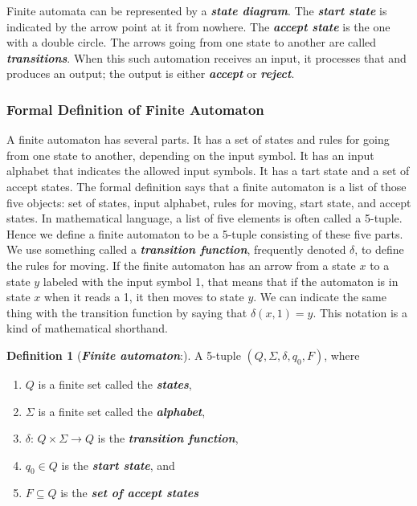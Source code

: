 \documentclass{article}
\theoremstyle{definition}
\newtheorem{definition}{Definition}[section]
\newcommand{\define}[1]{\textbf{\textit{#1}}}
\begin{document}
Finite automata can be represented by a \define{state diagram}. The \define{start state} is indicated by the arrow point at it from nowhere. The \define{accept state} is the one with a double circle. The arrows going from one state to another are called \define{transitions}. When this such automation receives an input, it processes that and produces an output; the output is either \define{accept} or \define{reject}. 

\subsubsection{Formal Definition of Finite Automaton}

A finite automaton has several parts. It has a set of states and rules for going from one state to another, depending on the input symbol. It has an input alphabet that indicates the allowed input symbols. It has a tart state and a set of accept states. The formal definition says that a finite automaton is a list of those five objects: set of states, input alphabet, rules for moving, start state, and accept states. In mathematical language, a list of five elements is often called a 5-tuple. Hence we define a finite automaton to be a 5-tuple consisting of these five parts. \\

We use something called a \define{transition function}, frequently denoted $\delta$, to define the rules for moving. If the finite automaton has an arrow from a state $x$ to a state $y$ labeled with the input symbol 1, that means that if the automaton is in state $x$ when it reads a 1, it then moves to state $y$. We can indicate the same thing with the transition function by saying that $\delta(x,1) = y$. This notation is a kind of mathematical shorthand. \\ 

\begin{definition}[\define{Finite automaton}:] A 5-tuple $(Q,\Sigma,\delta,q_{0},F)$, where 
\begin{enumerate}
  \item $Q$ is a finite set called the \define{states},
  \item $\Sigma$ is a finite set called the \define{alphabet},
  \item $\delta$: $Q \times \Sigma \rightarrow Q$ is the \define{transition function},
  \item $q_{0} \in Q$ is the \define{start state}, and 
  \item $F \subseteq Q$ is the \define{set of accept states} 
\end{enumerate}
\end{definition}
\end{document}
